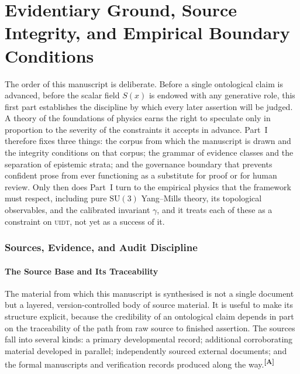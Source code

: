 \documentclass[12pt,a4paper,twoside]{article}
\theoremstyle{plain}
\theoremstyle{definition}
\theoremstyle{remark}
\newcommand{\UIDT}{\textsc{uidt}}
\newcommand{\catmark}[1]{\textsuperscript{\textsf{\textbf{[#1]}}}}
\newcommand{\Sx}{S(x)}
\begin{document}
\begin{abstract}
\endgroup
\end{abstract}

\newpage

\part{Evidentiary Ground, Source Integrity, and Empirical Boundary Conditions}
\label{part:evidentiary-ground}

\noindent The order of this manuscript is deliberate. Before a single ontological claim is advanced, before the scalar field $\Sx$ is endowed with any generative role, this first part establishes the discipline by which every later assertion will be judged. A theory of the foundations of physics earns the right to speculate only in proportion to the severity of the constraints it accepts in advance. Part~I therefore fixes three things: the corpus from which the manuscript is drawn and the integrity conditions on that corpus; the grammar of evidence classes and the separation of epistemic strata; and the governance boundary that prevents confident prose from ever functioning as a substitute for proof or for human review. Only then does Part~I turn to the empirical physics that the framework must respect, including pure $\mathrm{SU}(3)$ Yang--Mills theory, its topological observables, and the calibrated invariant $\gamma$, and it treats each of these as a constraint on \UIDT, not yet as a success of it.

\newpage
\section{Sources, Evidence, and Audit Discipline}
\label{sec:corpus-ledger-audit}

\subsection{The Source Base and Its Traceability}
\label{subsec:corpus-topology}

The material from which this manuscript is synthesised is not a single document but a layered, version-controlled body of source material. It is useful to make its structure explicit, because the credibility of an ontological claim depends in part on the traceability of the path from raw source to finished assertion. The sources fall into several kinds: a primary developmental record; additional corroborating material developed in parallel; independently sourced external documents; and the formal manuscripts and verification records produced along the way.\catmark{A}
\end{document}
